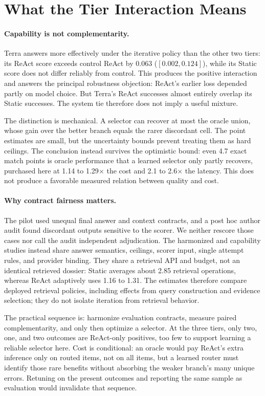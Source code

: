 \section{What the Tier Interaction Means}
\label{sec:analysis}

\paragraph{Capability is not complementarity.}
Terra answers more effectively under the iterative policy than the other two
tiers: its ReAct score exceeds control ReAct by 0.063
($[0.002,0.124]$), while its Static score does not differ reliably from control.
This produces the positive interaction and answers the principal robustness
objection: ReAct's earlier loss depended partly on model choice. But Terra's
ReAct successes almost entirely overlap its Static successes. The system tie
therefore does not imply a useful mixture.

The distinction is mechanical. A selector can recover at most the oracle union,
whose gain over the better branch equals the rarer discordant cell. The point
estimates are small, but the uncertainty bounds prevent treating them as hard
ceilings. The conclusion instead survives the optimistic bound: even 4.7
exact match points is oracle performance that a learned selector only partly
recovers, purchased here at 1.14 to 1.29$\times$ the cost and 2.1 to
2.6$\times$ the latency. This does not produce a favorable measured relation
between quality and cost.

\paragraph{Why contract fairness matters.}
The pilot used unequal final answer and context contracts, and a post hoc author
audit found discordant outputs sensitive to the scorer. We neither rescore those
cases
nor call the audit independent adjudication. The harmonized and capability
studies instead share answer semantics, ceilings, scorer input, single attempt
rules, and provider binding. They share a retrieval API and budget, not an
identical retrieved dossier: Static averages about 2.85 retrieval operations,
whereas ReAct adaptively uses 1.16 to 1.31. The estimates therefore compare
deployed retrieval policies, including effects from query construction and
evidence selection; they do not isolate iteration from retrieval behavior.

The practical sequence is: harmonize evaluation contracts, measure paired
complementarity, and only then optimize a selector. At the three tiers, only
two, one, and two outcomes are ReAct-only positives, too few to support learning
a reliable selector here. Cost is conditional: an oracle would pay ReAct's
extra inference only on routed items, not on all items, but a learned router
must identify those rare benefits without absorbing the weaker branch's many
unique errors. Retuning on the present outcomes and reporting the same sample
as evaluation would invalidate that sequence.
